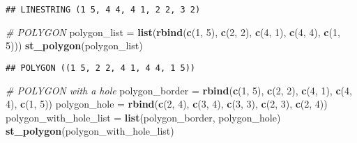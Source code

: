 \documentclass[]{article}
\newenvironment{Shaded}{\begin{snugshade}}{\end{snugshade}}
\newcommand{\CommentTok}[1]{\textcolor[rgb]{0.56,0.35,0.01}{\textit{#1}}}
\newcommand{\DecValTok}[1]{\textcolor[rgb]{0.00,0.00,0.81}{#1}}
\newcommand{\KeywordTok}[1]{\textcolor[rgb]{0.13,0.29,0.53}{\textbf{#1}}}
\newcommand{\NormalTok}[1]{#1}
\newcommand{\StringTok}[1]{\textcolor[rgb]{0.31,0.60,0.02}{#1}}
\begin{document}
\begin{verbatim}
## LINESTRING (1 5, 4 4, 4 1, 2 2, 3 2)
\end{verbatim}

\begin{Shaded}
\begin{Highlighting}[]
\CommentTok{# POLYGON}
\NormalTok{polygon_list =}\StringTok{ }\KeywordTok{list}\NormalTok{(}\KeywordTok{rbind}\NormalTok{(}\KeywordTok{c}\NormalTok{(}\DecValTok{1}\NormalTok{, }\DecValTok{5}\NormalTok{), }\KeywordTok{c}\NormalTok{(}\DecValTok{2}\NormalTok{, }\DecValTok{2}\NormalTok{), }\KeywordTok{c}\NormalTok{(}\DecValTok{4}\NormalTok{, }\DecValTok{1}\NormalTok{), }\KeywordTok{c}\NormalTok{(}\DecValTok{4}\NormalTok{, }\DecValTok{4}\NormalTok{), }\KeywordTok{c}\NormalTok{(}\DecValTok{1}\NormalTok{, }\DecValTok{5}\NormalTok{)))}
\KeywordTok{st_polygon}\NormalTok{(polygon_list)}
\end{Highlighting}
\end{Shaded}

\begin{verbatim}
## POLYGON ((1 5, 2 2, 4 1, 4 4, 1 5))
\end{verbatim}

\begin{Shaded}
\begin{Highlighting}[]
\CommentTok{# POLYGON with a hole}
\NormalTok{polygon_border =}\StringTok{ }\KeywordTok{rbind}\NormalTok{(}\KeywordTok{c}\NormalTok{(}\DecValTok{1}\NormalTok{, }\DecValTok{5}\NormalTok{), }\KeywordTok{c}\NormalTok{(}\DecValTok{2}\NormalTok{, }\DecValTok{2}\NormalTok{), }\KeywordTok{c}\NormalTok{(}\DecValTok{4}\NormalTok{, }\DecValTok{1}\NormalTok{), }\KeywordTok{c}\NormalTok{(}\DecValTok{4}\NormalTok{, }\DecValTok{4}\NormalTok{), }\KeywordTok{c}\NormalTok{(}\DecValTok{1}\NormalTok{, }\DecValTok{5}\NormalTok{))}
\NormalTok{polygon_hole =}\StringTok{ }\KeywordTok{rbind}\NormalTok{(}\KeywordTok{c}\NormalTok{(}\DecValTok{2}\NormalTok{, }\DecValTok{4}\NormalTok{), }\KeywordTok{c}\NormalTok{(}\DecValTok{3}\NormalTok{, }\DecValTok{4}\NormalTok{), }\KeywordTok{c}\NormalTok{(}\DecValTok{3}\NormalTok{, }\DecValTok{3}\NormalTok{), }\KeywordTok{c}\NormalTok{(}\DecValTok{2}\NormalTok{, }\DecValTok{3}\NormalTok{), }\KeywordTok{c}\NormalTok{(}\DecValTok{2}\NormalTok{, }\DecValTok{4}\NormalTok{))}
\NormalTok{polygon_with_hole_list =}\StringTok{ }\KeywordTok{list}\NormalTok{(polygon_border, polygon_hole)}
\KeywordTok{st_polygon}\NormalTok{(polygon_with_hole_list)}
\end{Highlighting}
\end{Shaded}
\end{document}
